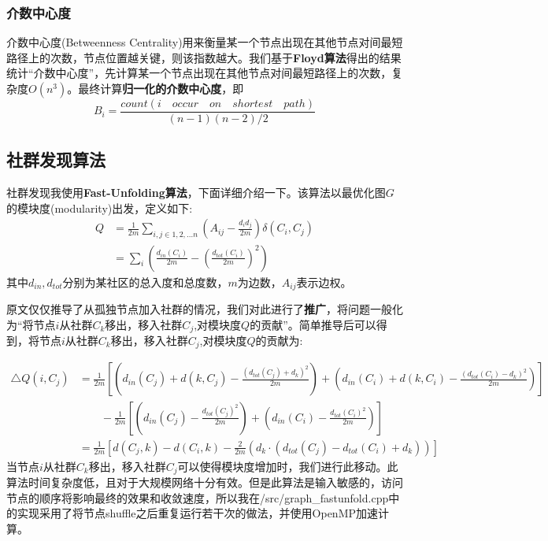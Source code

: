 \documentclass[UTF8, onecolumn, a4paper]{article}
\begin{document}
\subsubsection{介数中心度}
介数中心度(Betweenness Centrality)用来衡量某一个节点出现在其他节点对间最短路径上的次数，节点位置越关键，则该指数越大。我们基于\textbf{Floyd算法}得出的结果统计“介数中心度”，先计算某一个节点出现在其他节点对间最短路径上的次数，复杂度$O(n^3)$。最终计算\textbf{归一化的介数中心度}，即
$$B_i = \frac{count(i\quad occur\quad on\quad shortest\quad path)}{(n-1)(n-2) / 2}$$
\subsection{社群发现算法}
社群发现我使用\textbf{Fast-Unfolding算法}\cite{0803.0476}，下面详细介绍一下。该算法以最优化图$G$的模块度(modularity)\cite{cond-mat/0308217}出发，定义如下:
\begin{equation}
\begin{aligned}
Q &= \frac{1}{2m}\underset{i,j\in 1,2,...n}{\sum}\left(A_{ij} - \frac{d_i d_j}{2m}\right)\delta(C_i, C_j)\\
&=\underset{i}{\sum}\left(\frac{d_{in}(C_i)}{2m} - \left(\frac{d_{tot}(C_i)}{2m}\right)^2\right)
\end{aligned}
\end{equation}
其中$d_{in}, d_{tot}$分别为某社区的总入度和总度数，$m$为边数，$A_{ij}$表示边权。

原文仅仅推导了从孤独节点加入社群的情况，我们对此进行了\textbf{推广}，将问题一般化为“将节点$i$从社群$C_k$移出，移入社群$C_j$,对模块度$Q$的贡献”。简单推导后可以得到，将节点$i$从社群$C_k$移出，移入社群$C_j$,对模块度$Q$的贡献为:

\begin{equation}
\begin{aligned}
\triangle Q(i, C_j) &= \frac{1}{2m} \left[ \left(d_{in}(C_j) + d(k, C_j) - \frac{(d_{tot}(C_j)+d_k)^2}{2m}\right)+
\left( d_{in}(C_i) + d(k, C_i) - \frac{(d_{tot}(C_i)-d_k)^2}{2m} \right)\right]\\ 
&\qquad - \frac{1}{2m} \left[ \left( d_{in}(C_j) - \frac{d_{tot}(C_j)^2}{2m} \right) + 
\left( d_{in}(C_i) - \frac{ d_{tot} (C_i)^2 }{ 2m } \right) \right] \\
&= \frac{1}{2m}\left[d(C_j, k) - d(C_i, k) - \frac{2}{2m}\left(d_k \cdot(d_{tot}(C_j) - d_{tot}(C_i) + d_k)\right)\right]
\end{aligned}
\end{equation}
当节点$i$从社群$C_k$移出，移入社群$C_j$可以使得模块度增加时，我们进行此移动。此算法时间复杂度低，且对于大规模网络十分有效。但是此算法是输入敏感的，访问节点的顺序将影响最终的效果和收敛速度，所以我在/src/graph\_fastunfold.cpp中的实现采用了将节点shuffle之后重复运行若干次的做法，并使用OpenMP加速计算。
\end{document}
